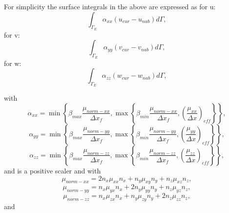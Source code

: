 For simplicity the surface integrals in the above are 
expressed as for u:
\begin{equation}
\int_{\Gamma_E} \alpha_{xx} (u_{cur}-u_{nab}) d\Gamma,
\end{equation}
for v:
\begin{equation}
\int_{\Gamma_E} \alpha_{yy} (v_{cur}-v_{nab}) d\Gamma,
\end{equation}
for w:
\begin{equation}
\int_{\Gamma_E} \alpha_{zz} (w_{cur}-w_{nab}) d\Gamma,
\end{equation}

with
\begin{equation}
\alpha_{xx}=
\min\left\{  \beta_{max}\frac{\mu_{norm-xx}}{{\Delta x}_{f}} , \max\left\{ \beta_{min}\frac{\mu_{norm-xx}}{{\Delta x}_{f}} , 
\left( \frac{\mu_{xx}}{\Delta x} \right)_{eff}
\right\} \right\} , 
\label{dg-alpha-xx-def} 
\end{equation} 
\begin{equation}
\alpha_{yy}=
\min\left\{  \beta_{max}\frac{\mu_{norm-yy}}{{\Delta x}_{f}} , \max\left\{ \beta_{min}\frac{\mu_{norm-yy}}{{\Delta x}_{f}} , 
\left( \frac{\mu_{yy}}{\Delta x} \right)_{eff}
\right\} \right\} , 
\label{dg-alpha-yy-def} 
\end{equation} 
\begin{equation}
\alpha_{zz}=
\min\left\{  \beta_{max}\frac{\mu_{norm-zz}}{{\Delta x}_{f}} , \max\left\{ \beta_{min}\frac{\mu_{norm-zz}}{{\Delta x}_{f}} , 
\left( \frac{\mu_{zz}}{\Delta x} \right)_{eff}
\right\} \right\} , 
\label{dg-alpha-zz-def} 
\end{equation} 
and is a positive scaler and with
\begin{equation}
\mu_{norm-xx}=2n_x \mu_{xx}  n_x + n_y \mu_{xy} n_y + n_z \mu_{xz} n_z, 
\end{equation}
\begin{equation}
\mu_{norm-yy}=n_x \mu_{yx}  n_x + 2n_y \mu_{yy}  n_y + n_z \mu_{yz} n_z, 
\end{equation}
\begin{equation}
\mu_{norm-zz}=n_x \mu_{zx}  n_x + n_y \mu_{zy} n_y + 2n_z \mu_{zz}  n_z, 
\end{equation}
and


